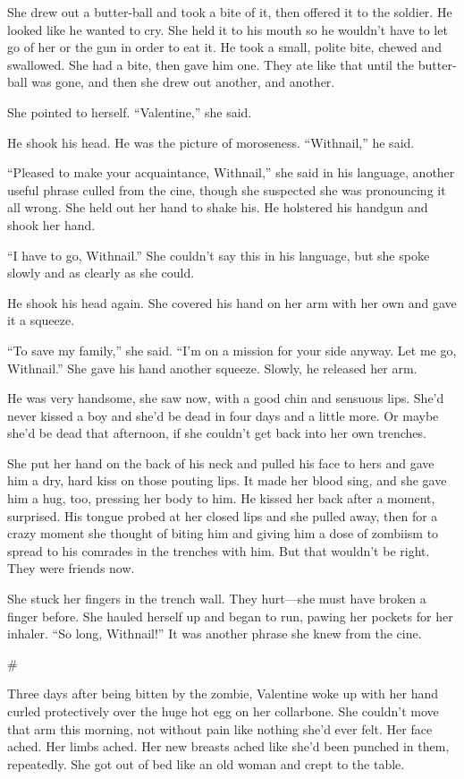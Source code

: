 She drew out a butter-ball and took a bite of it, then offered it
to the soldier. He looked like he wanted to cry. She held it to his
mouth so he wouldn’t have to let go of her or the gun in order to
eat it. He took a small, polite bite, chewed and swallowed. She had
a bite, then gave him one. They ate like that until the butter-ball
was gone, and then she drew out another, and another.

She pointed to herself. “Valentine,” she said.

He shook his head. He was the picture of moroseness. “Withnail,” he
said.

“Pleased to make your acquaintance, Withnail,” she said in his
language, another useful phrase culled from the cine, though she
suspected she was pronouncing it all wrong. She held out her hand
to shake his. He holstered his handgun and shook her hand.

“I have to go, Withnail.” She couldn’t say this in his language,
but she spoke slowly and as clearly as she could.

He shook his head again. She covered his hand on her arm with her
own and gave it a squeeze.

“To save my family,” she said. “I’m on a mission for your side
anyway. Let me go, Withnail.” She gave his hand another squeeze.
Slowly, he released her arm.

He was very handsome, she saw now, with a good chin and sensuous
lips. She’d never kissed a boy and she’d be dead in four days and a
little more. Or maybe she’d be dead that afternoon, if she couldn’t
get back into her own trenches.

She put her hand on the back of his neck and pulled his face to
hers and gave him a dry, hard kiss on those pouting lips. It made
her blood sing, and she gave him a hug, too, pressing her body to
him. He kissed her back after a moment, surprised. His tongue
probed at her closed lips and she pulled away, then for a crazy
moment she thought of biting him and giving him a dose of zombiism
to spread to his comrades in the trenches with him. But that
wouldn’t be right. They were friends now.

She stuck her fingers in the trench wall. They hurt—she must have
broken a finger before. She hauled herself up and began to run,
pawing her pockets for her inhaler. “So long, Withnail!” It was
another phrase she knew from the cine.

\#

Three days after being bitten by the zombie, Valentine woke up with
her hand curled protectively over the huge hot egg on her
collarbone. She couldn’t move that arm this morning, not without
pain like nothing she’d ever felt. Her face ached. Her limbs ached.
Her new breasts ached like she’d been punched in them, repeatedly.
She got out of bed like an old woman and crept to the table.

